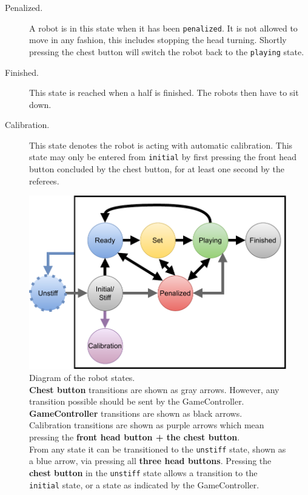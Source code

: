 \begin{description}
  \item[Penalized.] A robot is in this state when it has been \texttt{penalized}. It is not allowed to move in any fashion,  this includes stopping the head turning. Shortly pressing the chest button will switch the robot back to the \texttt{playing} state.

  \item[Finished.] This state is reached when a half is finished. The robots then have to sit down.

  \item[Calibration.] This state denotes the robot is acting with automatic calibration. This state may only be entered from \texttt{initial} by first pressing the front head button concluded by the chest button, for at least one second by the referees.


\end{description}

\begin{figure}[t]
  \centerline{\includegraphics[width=0.9\columnwidth]{figs/states_new.pdf}}
  \caption{Diagram of the robot states.
    \\\textbf{Chest button} transitions are shown as gray arrows. However, any transition possible should be sent by the GameController.
    \\\textbf{GameController} transitions are shown as black arrows.
    \\Calibration transitions are shown as purple arrows which mean pressing the \textbf{front head button + the chest button}.
    \\From any state it can be transitioned to the \texttt{unstiff} state, shown as a blue arrow, via pressing all \textbf{three head buttons}. Pressing the \textbf{chest button} in the \texttt{unstiff} state allows a transition to the \texttt{initial} state, or a state as indicated by the GameController.}
  \label{fig:robot_states}
\end{figure}

